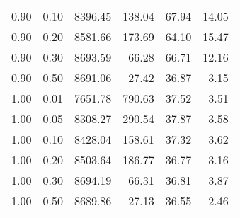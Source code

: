 \begin{table}
\begin{tabular}{rrrrrr}
0.90 & 0.10 & 8396.45 & 138.04 & 67.94 & 14.05 \\
0.90 & 0.20 & 8581.66 & 173.69 & 64.10 & 15.47 \\
0.90 & 0.30 & 8693.59 & 66.28 & 66.71 & 12.16 \\
0.90 & 0.50 & 8691.06 & 27.42 & 36.87 & 3.15 \\
1.00 & 0.01 & 7651.78 & 790.63 & 37.52 & 3.51 \\
1.00 & 0.05 & 8308.27 & 290.54 & 37.87 & 3.58 \\
1.00 & 0.10 & 8428.04 & 158.61 & 37.32 & 3.62 \\
1.00 & 0.20 & 8503.64 & 186.77 & 36.77 & 3.16 \\
1.00 & 0.30 & 8694.19 & 66.31 & 36.81 & 3.87 \\
1.00 & 0.50 & 8689.86 & 27.13 & 36.55 & 2.46 \\
\bottomrule
\end{tabular}
\end{table}

